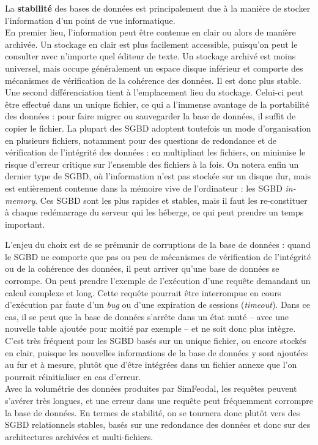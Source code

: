 La \textbf{stabilité} des bases de données est principalement due à la manière de stocker l'information d'un point de vue informatique.\\
En premier lieu, l'information peut être contenue \og en clair\fg{} ou alors de manière archivée.
Un stockage \og en clair\fg{} est plus facilement accessible, puisqu'on peut le consulter avec n'importe quel éditeur de texte.
Un stockage archivé est moins universel, mais occupe généralement un espace disque inférieur et comporte des mécanismes de vérification de la cohérence des données.
Il est donc plus stable.\\
Une second différenciation tient à l'emplacement lieu du stockage.
Celui-ci peut être effectué dans un unique fichier, ce qui a l'immense avantage de la portabilité des données : pour faire migrer ou sauvegarder la base de données, il suffit de copier le fichier.
La plupart des SGBD adoptent toutefois un mode d'organisation en plusieurs fichiers, notamment pour des questions de redondance et de vérification de l'intégrité des données : en multipliant les fichiers, on minimise le risque d'erreur critique sur l'ensemble des fichiers à la fois.
On notera enfin un dernier type de SGBD, où l'information n'est pas stockée sur un disque dur, mais est entièrement contenue dans la mémoire vive de l'ordinateur : les SGBD \og \textit{in-memory}\fg{}.
Ces SGBD sont les plus rapides et stables, mais il faut les re-constituer à chaque redémarrage du serveur qui les héberge, ce qui peut prendre un temps important.

L'enjeu du choix est de se prémunir de \og corruptions\fg{} de la base de données : quand le SGBD ne comporte que pas ou peu de mécanismes de vérification de l'intégrité ou de la cohérence des données, il peut arriver qu'une base de données se corrompe.
On peut prendre l'exemple de l'exécution d'une requête demandant un calcul complexe et long.
Cette requête pourrait être interrompue en cours d'exécution par faute d'un \textit{bug} ou d'une expiration de sessions (\textit{timeout}). Dans ce cas, il se peut que la base de données s'arrête dans un état muté -- avec une nouvelle table ajoutée pour moitié par exemple -- et ne soit donc plus intègre.
C'est très fréquent pour les SGBD basés sur un unique fichier, ou encore stockés en clair, puisque les nouvelles informations de la base de données y sont ajoutées au fur et à mesure, plutôt que d'être intégrées dans un fichier annexe que l'on pourrait réinitialiser en cas d'erreur.\\
Avec la volumétrie des données produites par SimFeodal, les requêtes peuvent s'avérer très longues, et une erreur dans une requête peut fréquemment corrompre la base de données.
En termes de stabilité, on se tournera donc plutôt vers des SGBD relationnels stables, basés sur une redondance des données et donc sur des architectures archivées et multi-fichiers.


